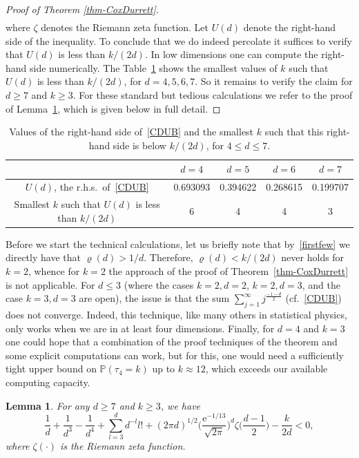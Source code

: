 \documentclass[a4paper, oneside, 11pt]{amsart}
\newcommand{\e}{\mathrm e}
\newtheorem{lemma}[theorem]{Lemma}
\theoremstyle{definition}
\renewcommand{\P}{\mathbb{P}}
\newcommand{\1}{\mathbbm{1}}
\newcommand{\0}{\mathbf{o}}
\numberwithin{equation}{section}
\begin{document}
\begin{proof}[Proof of Theorem \ref{thm-CoxDurrett}]
\begin{equation}
\begin{aligned}
\end{aligned}\end{equation}
where $\zeta$ denotes the Riemann zeta function. Let $U(d)$ denote the right-hand side of the inequality. To conclude that we do indeed percolate it suffices to verify that $U(d)$ is less than $k/(2d)$. In low dimensions one can compute the right-hand side numerically. 
The Table~\ref{table-CD} shows the smallest values of $k$ such that $U(d)$ is less than $k/(2d)$, for $d=4,5,6,7$.
So it remains to verify the claim for $d \geq 7$ and $k\geq 3$. For these standard but tedious calculations we refer to the proof of Lemma~\ref{lemma-largedmon}, which is given below in full detail. 
\end{proof}
\begin{table}[hb]
\begin{center}
    \begin{tabular}{|c|c|c|c|c|} \hline
       &  $d=4$ & $d=5$ & $d=6$ & $d=7$ \\ \hline
        $U(d)$, the r.h.s.\ of~\eqref{CDUB}   & 0.693093  & 0.394622  & 0.268615 & 0.199707  \\ \hline
         Smallest $k$ such that $U(d)$ is less than $k/(2d) $ & 6 & 4 & 4 & 3 \\ \hline 
    \end{tabular}
\end{center}
\caption{Values of the right-hand side of~\eqref{CDUB} and the smallest $k$ such that this right-hand side is below $k/(2d) $, for $4 \leq d \leq 7$.}\label{table-CD}
\end{table}

Before we start the technical calculations, let us briefly note that by~\eqref{firstfew} we directly have that $\varrho(d) >1/d$. Therefore, $\varrho(d)<k/(2d)$ never holds for $k=2$, whence for $k=2$ the approach of the proof of Theorem~\ref{thm-CoxDurrett} is not applicable. 
For $d\leq 3$ (where the cases $k=2,d=2$, $k=2,d=3$, and the case $k=3,d=3$ are open), the issue is that the sum $\sum_{j=1}^{\infty} j^{\frac{-1-d}{2}}$ (cf.\ \eqref{CDUB}) does not converge. 
Indeed, this technique, like many others in statistical physics, only works when we are in at least four dimensions.
Finally, for $d=4$ and $k=3$ one could hope that a combination of the proof techniques of the theorem and some explicit computations can work, but for this, one would need a sufficiently tight upper bound on $\P(\tau_4 = k)$ up to $k \approx 12$, which exceeds our available computing capacity. 

\begin{lemma}\label{lemma-largedmon}
For any $d \geq 7$ and $k \geq 3$, we have
\begin{equation}\label{largedmon} \frac{1}{d} + \frac{1}{d^3} -\frac{1}{d^4} + \sum_{l=3}^d d^{-l} l! +  (2\pi d)^{1/2} \Big( \frac{\e^{-1/13}}{\sqrt{2\pi}} \Big)^d \zeta\Big( \frac{d-1}{2} \Big) - \frac{k}{2d} < 0,  
\end{equation}
where $\zeta(\cdot)$ is the Riemann zeta function. 
\end{lemma}
\end{document}
